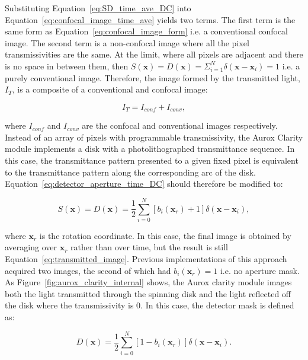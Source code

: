 Substituting Equation~\ref{eq:SD_time_ave_DC} into Equation~\ref{eq:confocal_image_time_ave} 
yields two terms. The first term is the same form as 
Equation~\ref{eq:confocal_image_form} i.e. a conventional 
confocal image. The second term is a non-confocal image 
where all the pixel transmissivities are the same. At the 
limit, where all pixels are adjacent and there is no space 
in between them, then $S\left(\textbf{x}\right) = 
D\left(\textbf{x}\right) = \Sigma_{i=1}^{N}\delta\left(
\textbf{x} - \textbf{x}_{i}\right) = 1$ i.e. a purely 
conventional image\cite{juskaitis1996efficient,wilson1996confocal}. 
Therefore, the image formed by the transmitted light, $I_{T}$, 
is a composite of a conventional and confocal image:

\begin{equation}\label{eq:transmitted_image}
I_{T} = I_{conf} + I_{conv},
\end{equation}

where $I_{conf}$ and $I_{conv}$ are the confocal and 
conventional images respectively. Instead of an array of 
pixels with programmable transmissivity, the Aurox Clarity 
module implements a disk with a photolithographed 
transmittance sequence. In this case, the transmittance 
pattern presented to a given fixed pixel is equivalent to 
the transmittance pattern along the corresponding arc of 
the disk\cite{wilson1996confocal}. 
Equation~\ref{eq:detector_aperture_time_DC} should therefore 
be modified to:

\begin{equation}\label{eq:detector_aperture_arc}
S\left(\textbf{x}\right) = D\left(\textbf{x}\right) = \frac{1}{2} \sum_{i=0}^{N} \left[b_{i}\left(\textbf{x}_{r}\right) + 1\right]\delta\left(\textbf{x} - \textbf{x}_{i}\right),
\end{equation}

where $\textbf{x}_{r}$ is the rotation coordinate. In 
this case, the final image is obtained by averaging over 
$\textbf{x}_{r}$ rather than over time, but the result is 
still Equation~\ref{eq:transmitted_image}. Previous 
implementations of this approach acquired two images, the 
second of which had $b_{i}\left(\textbf{x}_{r}\right) = 1$ 
i.e. no aperture mask. As Figure~\ref{fig:aurox_clarity_internal} 
shows, the Aurox clarity module images both the light 
transmitted through the spinning disk and the light 
reflected off the disk where the transmissivity is $0$. In 
this case, the detector mask is defined as:

\begin{equation}\label{eq:detector_aperture_arc_reflect}
D\left(\textbf{x}\right) = \frac{1}{2} \sum_{i=0}^{N} \left[1 - b_{i}\left(\textbf{x}_{r}\right)\right]\delta\left(\textbf{x} - \textbf{x}_{i}\right).
\end{equation}

